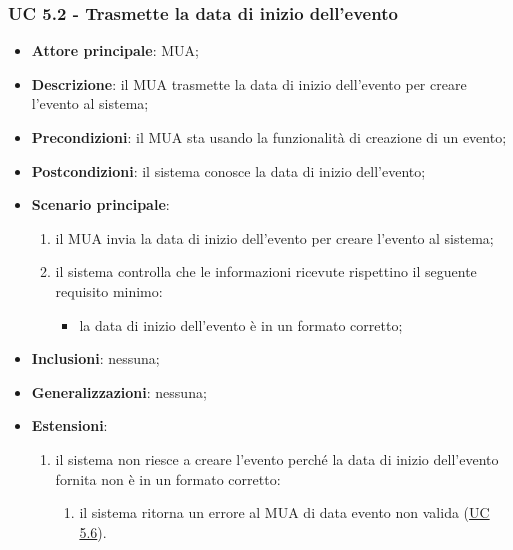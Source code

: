     \subsubsection{UC 5.2 - Trasmette la data di inizio dell'evento} \label{sec:UC5.2}
    \begin{itemize}
        \item \textbf{Attore principale}: MUA;
        \item \textbf{Descrizione}: il MUA trasmette la data di inizio dell'evento per creare l'evento al sistema;
        \item \textbf{Precondizioni}: il MUA sta usando la funzionalità di creazione di un evento;
        \item \textbf{Postcondizioni}: il sistema conosce la data di inizio dell'evento;
        \item \textbf{Scenario principale}:
            \begin{enumerate}
                \item il MUA invia la data di inizio dell'evento per creare l'evento al sistema;
                \item il sistema controlla che le informazioni ricevute rispettino il seguente requisito minimo:
                    \begin{itemize}
                        \item la data di inizio dell'evento è in un formato corretto;
                    \end{itemize}
            \end{enumerate}
        \item \textbf{Inclusioni}: nessuna;
        \item \textbf{Generalizzazioni}: nessuna;
        \item \textbf{Estensioni}:
            \begin{enumerate}[label=\alph*.]
                \item il sistema non riesce a creare l'evento perché la data di inizio dell'evento fornita non è in un formato corretto:
                \begin{enumerate}[label=\arabic*.]
                    \item il sistema ritorna un errore al MUA di data evento non valida (\hyperref[sec:UC5.6]{UC 5.6}).
                \end{enumerate}
            \end{enumerate}
    \end{itemize}


